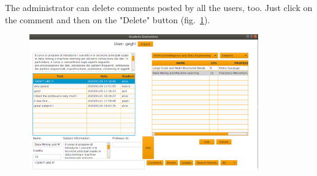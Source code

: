 \documentclass[a4paper]{article}
\begin{document}
The administrator can delete comments posted by all the users, too. Just click on the comment and then on the "Delete" button (fig.~\ref{fig:admin4}).
\begin{figure}[h]
\centering
\includegraphics[width=0.88\textwidth]{images/screens/admin4}
\label{fig:admin4}
\end{figure}
\end{document}
